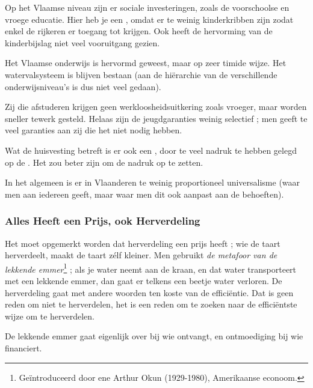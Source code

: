 \par Op het Vlaamse niveau zijn er sociale investeringen, zoals de voorschoolse en vroege educatie. Hier heb je een , omdat er te weinig kinderkribben zijn zodat enkel de rijkeren er toegang tot krijgen. Ook heeft de hervorming van de kinderbijslag niet veel vooruitgang gezien.
\par Het Vlaamse onderwijs is hervormd geweest, maar op zeer timide wijze. Het watervalsysteem is blijven bestaan (aan de hi\"erarchie van de verschillende onderwijsniveau's is dus niet veel gedaan).
\par Zij die afstuderen krijgen geen werkloosheidsuitkering zoals vroeger, maar worden sneller tewerk gesteld. Helaas zijn de jeugdgaranties weinig selectief ; men geeft te veel garanties aan zij die het niet nodig hebben.
\par Wat de huisvesting betreft is er ook een , door te veel nadruk te hebben gelegd op de . Het zou beter zijn om de nadruk op  te zetten.
\par In het algemeen is er in Vlaanderen te weinig proportioneel universalisme (waar men aan iedereen geeft, maar waar men dit ook aanpast aan de behoeften).

\subsubsection{Alles Heeft een Prijs, ook Herverdeling}

Het moet opgemerkt worden dat herverdeling een prijs heeft ; wie de taart herverdeelt, maakt de taart z\'elf kleiner. Men gebruikt \textit{de metafoor van de lekkende emmer}\footnote{Ge\"introduceerd door ene Arthur Okun (1929-1980), Amerikaanse econoom.} ; als je water neemt aan de kraan, en dat water transporteert met een lekkende emmer, dan gaat er telkens een beetje water verloren. De herverdeling gaat met andere woorden ten koste van de effici\"entie. Dat is geen reden om niet te herverdelen, het is een reden om te zoeken naar de effici\"entste wijze om te herverdelen.
\par De lekkende emmer gaat eigenlijk over  bij wie ontvangt, en ontmoediging bij wie financiert. \\


